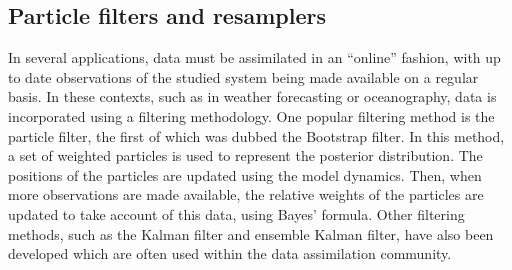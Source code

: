 \documentclass[final]{siamltex}
\begin{document}




\subsection{Particle filters and resamplers}\label{sec:filters}
In several applications, data must be assimilated in an ``online''
fashion, with up to date observations of the studied system being made
available on a regular basis. In these contexts, such as in weather forecasting or
oceanography, data is incorporated using a filtering
methodology. One popular filtering method is the particle filter, the
first of which was dubbed the Bootstrap
filter\cite{gordon1993novel}. In this method, a set of weighted particles is
used to represent the posterior distribution. The positions of the
particles are updated using the model dynamics. Then, when more
observations are made available, the relative weights of the particles
are updated to take account of this data, using Bayes' formula. Other filtering methods, such
as the Kalman filter\cite{kalman1960new} and ensemble Kalman filter\cite{evensen1994sequential}, have also been developed which are often used within the data
assimilation community.
\end{document}
